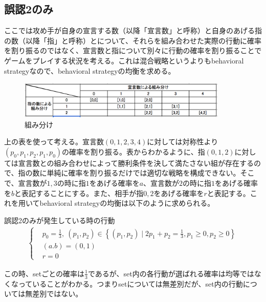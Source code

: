 \documentclass{jsarticle}
\begin{document}
\subsection{誤認2のみ}
ここでは攻め手が自身の宣言する数（以降「宣言数」と呼称）と自身のあげる指の数（以降「指」と呼称）とについて、それらを組み合わせた実際の行動に確率を割り振るのではなく、宣言数と指について別々に行動の確率を割り振ることでゲームをプレイする状況を考える。これは混合戦略というよりもbehavioral strategyなので、behavioral strategyの均衡を求める。
\begin{figure}[h]
    \centering
    \includegraphics[width=10cm]{class2.png}
    \caption{組み分け}
\end{figure}

上の表を使って考える。宣言数$(0,1,2,3,4)$に対しては対称性より$(p_0, p_1, p_2, p_1, p_0)$の確率を割り振る。表からわかるように、指$(0,1,2)$に対しては宣言数との組み合わせによって勝利条件を決して満たさない組が存在するので、指の数に単純に確率を割り振るだけでは適切な戦略を構成できない。そこで、宣言数が$1, 3$の時に指$1$をあげる確率を$a$、宣言数が$2$の時に指$1$をあげる確率を$b$と表記することにする。また、相手が指$0,2$をあげる確率を$r$と表記する。これを用いてbehavioral strategyの均衡は以下のように求められる。

\begin{itembox}[l]{誤認2のみが発生している時の行動}
\begin{align}
	\begin{cases}
    	&p_0 = \frac{1}{3},\ (p_1, p_2) \in \left\{ (p_1, p_2) \mid 2p_1 + p_2 = \frac{1}{3}, p_1 \geq 0, p_2 \geq 0\right\}\\[10pt]
	&(a.b) = (0,1)\\[10pt]
	&r = 0
	\end{cases}
\end{align}
\end{itembox}
この時、setごとの確率は$\frac{1}{3}$であるが、set内の各行動が選ばれる確率は均等ではなくなっていることがわかる。つまりsetについては無差別だが、set内の行動については無差別ではない。
\end{document}
